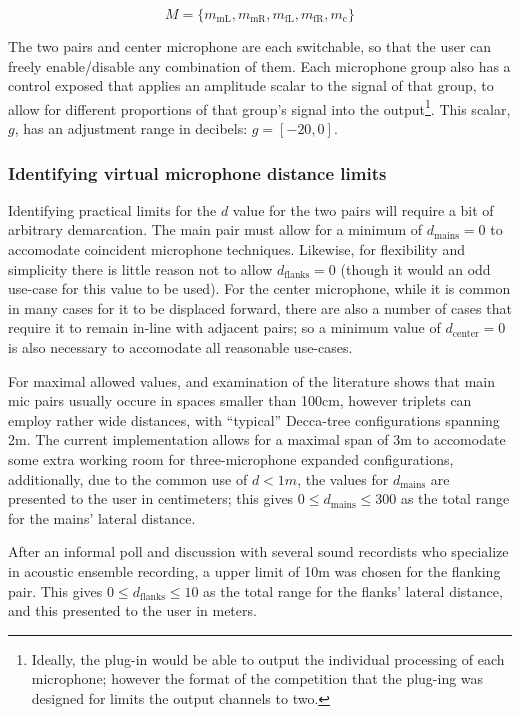 \begin{equation}
	M = \{m_\text{mL}, m_\text{mR}, m_\text{fL}, m_\text{fR}, m_\text{c}\}
\end{equation}

The two pairs and center microphone are each switchable, so that the user can freely enable/disable any combination of them. Each microphone group also has a control exposed that applies an amplitude scalar to the signal of that group, to allow for different proportions of that group's signal into the output\footnote{Ideally, the plug-in would be able to output the individual processing of each microphone; however the format of the competition that the plug-ing was designed for limits the output channels to two.}. This scalar, $g$, has an adjustment range in decibels: $g = [-20,0]$.

\subsubsection{Identifying virtual microphone distance limits}

Identifying practical limits for the $d$ value for the two pairs will require a bit of arbitrary demarcation. The main pair must allow for a minimum of $d_\text{mains}=0$ to accomodate coincident microphone techniques. Likewise, for flexibility and simplicity there is little reason not to allow $d_\text{flanks} = 0$ (though it would an odd use-case for this value to be used). For the center microphone, while it is common in many cases for it to be displaced forward, there are also a number of cases that require it to remain in-line with adjacent pairs; so a minimum value of $d_\text{center} = 0$ is also necessary to accomodate all reasonable use-cases.

For maximal allowed values, and examination of the literature shows that main mic pairs usually occure in spaces smaller than 100cm, however triplets can employ rather wide distances, with ``typical'' Decca-tree configurations spanning 2m. The current implementation allows for a maximal span of 3m to accomodate some extra working room for three-microphone expanded configurations, additionally, due to the common use of $d < 1m$, the values for $d_\text{mains}$ are presented to the user in centimeters; this gives $0 \leq d_\text{mains} \leq 300$ as the total range for the mains' lateral distance.

After an informal poll and discussion with several sound recordists who specialize in acoustic ensemble recording, a upper limit of 10m was chosen for the flanking pair. This gives $0 \leq d_\text{flanks} \leq 10$ as the total range for the flanks' lateral distance, and this presented to the user in meters.


